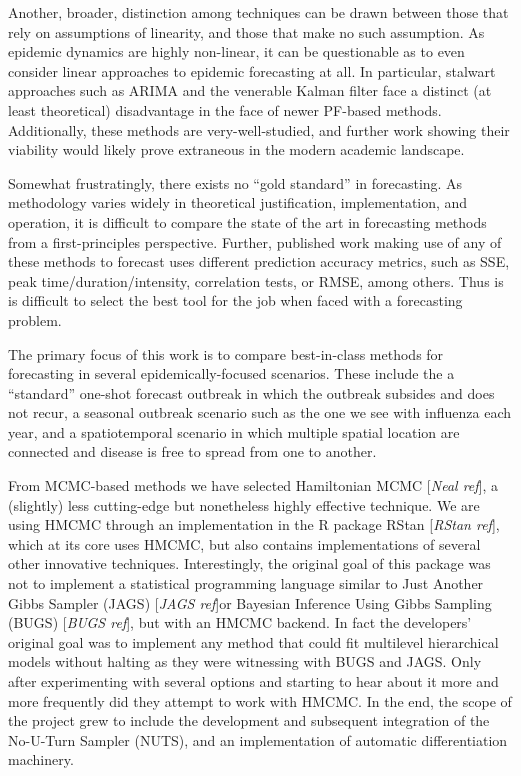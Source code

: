 Another, broader, distinction among techniques can be drawn between those that rely on assumptions of linearity, and those that make no such assumption. As epidemic dynamics are highly non-linear, it can be questionable as to even consider linear approaches to epidemic forecasting at all. In particular, stalwart approaches such as ARIMA and the venerable Kalman filter face a distinct (at least theoretical) disadvantage in the face of newer PF-based methods. Additionally, these methods are very-well-studied, and further work showing their viability would likely prove extraneous in the modern academic landscape.

Somewhat frustratingly, there exists no ``gold standard'' in forecasting. As methodology varies widely in theoretical justification, implementation, and operation, it is difficult to compare the state of the art in forecasting methods from a first-principles perspective. Further, published work making use of any of these methods to forecast uses different prediction accuracy metrics, such as SSE, peak time/duration/intensity, correlation tests, or RMSE, among others. Thus is is difficult to select the best tool for the job when faced with a forecasting problem.

The primary focus of this work is to compare best-in-class methods for forecasting in several epidemically-focused scenarios. These include the a ``standard'' one-shot forecast outbreak in which the outbreak subsides and does not recur, a seasonal outbreak scenario such as the one we see with influenza each year, and a spatiotemporal scenario in which multiple spatial location are connected and disease is free to spread from one to another.

From MCMC-based methods we have selected Hamiltonian MCMC [\textit{Neal ref}], a (slightly) less cutting-edge but nonetheless highly effective technique. We are using HMCMC through an implementation in the R package RStan [\textit{RStan ref}], which at its core uses HMCMC, but also contains implementations of several other innovative techniques. Interestingly, the original goal of this package was not to implement a statistical programming language similar to Just Another Gibbs Sampler (JAGS) [\textit{JAGS ref}]or Bayesian Inference Using Gibbs Sampling (BUGS) [\textit{BUGS ref}], but with an HMCMC backend. In fact the developers' original goal was to implement any method that could fit multilevel hierarchical models without halting as they were witnessing with BUGS and JAGS. Only after experimenting with several options and starting to hear about it more and more frequently did they attempt to work with HMCMC. In the end, the scope of the project grew to include the development and subsequent integration of the No-U-Turn Sampler (NUTS), and an implementation of automatic differentiation machinery.


